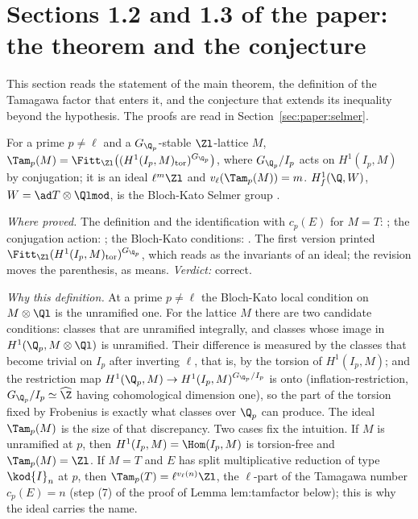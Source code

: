 \begin{sloppypar}
\section[Paper 1.2, 1.3: theorem and conjecture]{Sections 1.2 and 1.3 of the paper: the theorem and the conjecture}\label{sec:paper:main-statements}

This section reads the statement of the main theorem, the definition of the Tamagawa factor that enters it, and the conjecture that extends its
inequality beyond the hypothesis. The proofs are read in Section~\ref{sec:paper:selmer}.

\begin{definition}\label{def:paper:tamagawa}
For a prime $p\ne\ell$ and a $G_{\Q_p}$-stable $\Zl$-lattice $M$, $\Tam_p(M)=\Fitt_{\Zl}\bigl((H^1(I_p,M)_{\mathrm{tor}})^{G_{\Q_p}}\bigr)$, where $G_{\Q_p}/I_p$ acts on $H^1(I_p,M)$ by
conjugation; it is an ideal $\ell^m\Zl$ and $v_\ell(\Tam_p(M))=m$. $H^1_f(\Q,W)$, $W=\ad T\otimes\Qlmod$, is the Bloch-Kato Selmer group \cite[Section 2.1]{DFG04}.
\end{definition}

\noindent\emph{Where proved.} The definition and the identification with $c_p(E)$ for $M=T$: ; the conjugation action: ; the
Bloch-Kato conditions: . The first version printed $\Fitt_{\Zl}(H^1(I_p,M)_{\mathrm{tor}})^{G_{\Q_p}}$, which reads as the invariants of an ideal;
the revision moves the parenthesis, as \cite[I.4.2.2]{FPR94} means. \emph{Verdict:} correct.

\emph{Why this definition.} At a prime $p\ne\ell$ the Bloch-Kato local condition on $M\otimes\Ql$ is the unramified one. For the lattice $M$ there are two candidate conditions:
classes that are unramified integrally, and classes whose image in $H^1(\Q_p,M\otimes\Ql)$ is unramified. Their difference is measured by the classes that become trivial on $I_p$
after inverting $\ell$, that is, by the torsion of $H^1(I_p,M)$; and the restriction map $H^1(\Q_p,M)\to H^1(I_p,M)^{G_{\Q_p}/I_p}$ is onto (inflation-restriction, $G_{\Q_p}/I_p\simeq\widehat\Z$
having cohomological dimension one), so the part of the torsion fixed by Frobenius is exactly what classes over $\Q_p$ can produce. The ideal $\Tam_p(M)$ is the size
of that discrepancy. Two cases fix the intuition. If $M$ is unramified at $p$, then $H^1(I_p,M)=\Hom(I_p,M)$ is torsion-free and $\Tam_p(M)=\Zl$. If $M=T$ and $E$ has split
multiplicative reduction of type $\kod{I}_n$ at $p$, then $\Tam_p(T)=\ell^{v_\ell(n)}\Zl$, the $\ell$-part of the Tamagawa number $c_p(E)=n$ (step (7) of the proof of
Lemma lem:tamfactor below); this is why the ideal carries the name.


\end{sloppypar}
